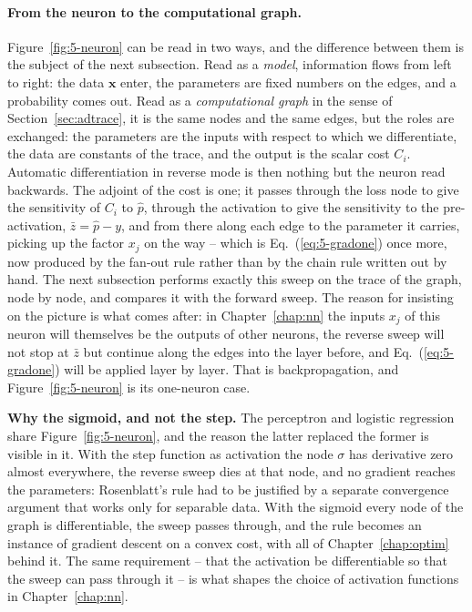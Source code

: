\paragraph{From the neuron to the computational graph.}
Figure~\ref{fig:5-neuron} can be read in two ways, and the difference
between them is the subject of the next subsection.  Read as a
\emph{model}, information flows from left to right: the data $\bm{x}$ enter,
the parameters are fixed numbers on the edges, and a probability comes out.
Read as a \emph{computational graph} in the sense of
Section~\ref{sec:adtrace}, it is the same nodes and the same edges, but the
roles are exchanged: the parameters are the inputs with respect to which we
differentiate, the data are constants of the trace, and the output is the
scalar cost $C_i$.  Automatic differentiation in reverse mode is then
nothing but the neuron read backwards.  The adjoint of the cost is one; it
passes through the loss node to give the sensitivity of $C_i$ to $\hat p$,
through the activation to give the sensitivity to the pre-activation,
$\bar z=\hat p-y$, and from there along each edge to the parameter it
carries, picking up the factor $x_j$ on the way -- which is
Eq.~(\ref{eq:5-gradone}) once more, now produced by the fan-out rule rather
than by the chain rule written out by hand.  The next subsection performs
exactly this sweep on the trace of the graph, node by node, and compares it
with the forward sweep.  The reason for insisting on the picture is what
comes after: in Chapter~\ref{chap:nn} the inputs $x_j$ of this neuron will
themselves be the outputs of other neurons, the reverse sweep will not stop
at $\bar z$ but continue along the edges into the layer before, and
Eq.~(\ref{eq:5-gradone}) will be applied layer by layer.  That is
backpropagation, and Figure~\ref{fig:5-neuron} is its one-neuron case.

\begin{notebox}
\textbf{Why the sigmoid, and not the step.}  The perceptron and logistic
regression share Figure~\ref{fig:5-neuron}, and the reason the latter
replaced the former is visible in it.  With the step function as
activation the node $\sigma$ has derivative zero almost everywhere, the
reverse sweep dies at that node, and no gradient reaches the parameters:
Rosenblatt's rule had to be justified by a separate convergence argument
that works only for separable data.  With the sigmoid every node of the
graph is differentiable, the sweep passes through, and the rule becomes an
instance of gradient descent on a convex cost, with all of
Chapter~\ref{chap:optim} behind it.  The same requirement -- that the
activation be differentiable so that the sweep can pass through it -- is
what shapes the choice of activation functions in Chapter~\ref{chap:nn}.
\end{notebox}

